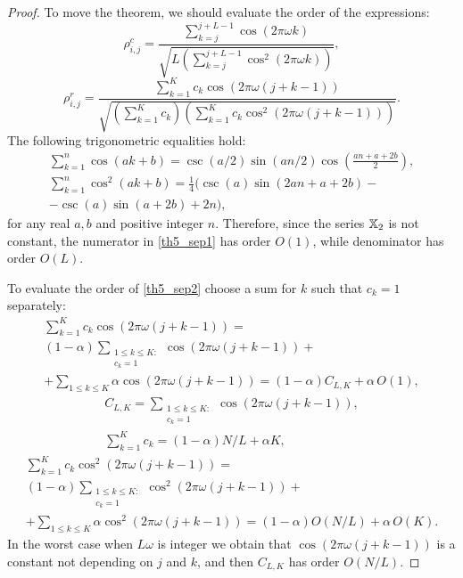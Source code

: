 \documentclass[sii]{ipart}
\begin{document}
\begin{proof}
	To move the theorem, we should evaluate the order of the expressions:
	\begin{equation}\label{th5_sep1}
	\rho^c_{i,j} = \frac{\sum_{k=j}^{j + L - 1} \cos(2 \pi \omega k)}{\sqrt{L (\sum_{k=j}^{j + L - 1} \cos^2(2 \pi \omega k))}},
	\end{equation}
	\begin{equation}\label{th5_sep2}
	\rho^r_{i,j} = \frac{\sum_{k=1}^K c_k\cos(2 \pi \omega (j + k - 1))}{\sqrt{(\sum_{k=1}^K c_k) (\sum_{k=1}^K c_k\cos^2(2 \pi \omega (j + k - 1)))}}.
	\end{equation}
	The following trigonometric equalities hold:
	\begin{multline*}
	\sum_{k=1}^n \cos(ak + b) = \csc(a/2) \sin(an / 2) \cos \left(\frac{an + a + 2b}{2} \right), \\
	\sum_{k=1}^n \cos^2(ak + b) = \frac{1}{4}(\csc(a) \sin(2an + a + 2b) -\\ - \csc(a)\sin(a + 2b) + 2n),
	\end{multline*}
	for any real $a, b$ and positive integer $n$.
	Therefore, since the series $\mathbb{X}_2$ is not constant, the numerator in \eqref{th5_sep1} has order $O(1)$, while denominator has order $O(L)$.
	
	To evaluate the order of \eqref{th5_sep2} choose a sum for $k$ such that $c_k=1$ separately:
	\begin{multline*}
	\sum_{k=1}^K c_k\cos(2 \pi \omega (j + k - 1)) = \\ (1-\alpha) \sum_{\substack{1 \le k \le K: \\ c_k = 1}}\cos(2 \pi \omega (j + k - 1)) +\\ +\sum_{1 \le k \le K}\alpha \cos(2 \pi \omega (j + k - 1)) = (1-\alpha) C_{L,K} + \alpha\, O(1),
	\end{multline*}
    \begin{gather*}
	C_{L, K} = \sum_{\substack{1 \le k \le K: \\ c_k = 1}}\cos(2 \pi \omega (j + k - 1)),
	\\
	\sum_{k=1}^K c_k = (1-\alpha) N/L + \alpha K,
	\end{gather*}
    \begin{multline*}
	\sum_{k=1}^K c_k\cos^2(2 \pi \omega (j + k - 1)) = \\ (1-\alpha)\sum_{\substack{1 \le k \le K: \\ c_k = 1}}\cos^2(2 \pi \omega (j + k - 1)) +\\ +\sum_{1 \le k \le K }\alpha \cos^2(2 \pi \omega (j + k - 1)) = (1-\alpha) O(N/L) + \alpha\, O(K).
    \end{multline*}
	In the worst case when $L\omega$ is integer we obtain that $\cos(2 \pi \omega (j + k - 1))$ is a constant not depending on $j$ and $k$, and then $C_{L,K}$ has order $O(N/L)$.
\end{proof}
\end{document}
